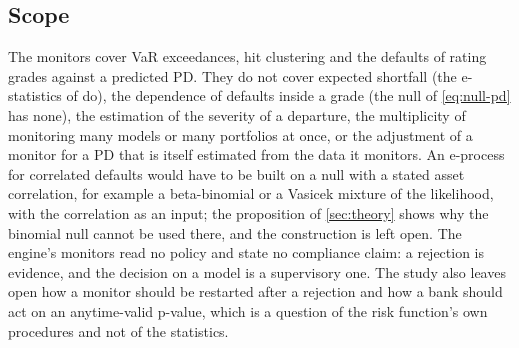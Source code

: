 \subsection{Scope}
\label{sec:limitations-scope}

The monitors cover VaR exceedances, hit clustering and the defaults of rating grades against a predicted PD. They do not cover expected shortfall (the e-statistics of \citet{wang2022} do), the dependence of defaults inside a grade (the null of \cref{eq:null-pd} has none), the estimation of the severity of a departure, the multiplicity of monitoring many models or many portfolios at once, or the adjustment of a monitor for a PD that is itself estimated from the data it monitors.
An e-process for correlated defaults would have to be built on a null with a stated asset correlation, for example a beta-binomial or a Vasicek mixture of the likelihood, with the correlation as an input; the proposition of \cref{sec:theory} shows why the binomial null cannot be used there, and the construction is left open. The engine's monitors read no policy and state no compliance claim: a rejection is evidence, and the decision on a model is a supervisory one. The study also leaves open how a monitor should be restarted after a rejection and how a bank should act on an anytime-valid p-value, which is a question of the risk function's own procedures and not of the statistics.
